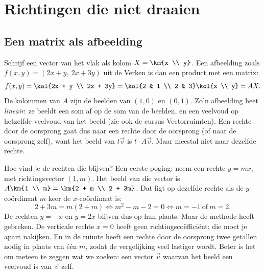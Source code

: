 \begin{oefeningen}[Start]

\end{oefeningen}


\section{Richtingen die niet draaien}

\subsection{Een matrix als afbeelding}

Schrijf een vector van het vlak als kolom $X = \km{x \\ y}$. Een afbeelding zoals $f(x, y) = (2x + y,\ 2x + 3y)$ uit de Verken is dan een product met een matrix:
\[ f(x, y) = \kol{2x + y \\ 2x + 3y} = \kol{2 & 1 \\ 2 & 3}\kol{x \\ y} = AX . \]
De kolommen van $A$ zijn de beelden van $(1, 0)$ en $(0, 1)$. Zo'n afbeelding heet \textit{lineair}: ze beeldt een som af op de som van de beelden, en een veelvoud op hetzelfde veelvoud van het beeld (zie ook de cursus Vectorruimten). Een rechte door de oorsprong gaat dus naar een rechte door de oorsprong (of naar de oorsprong zelf), want het beeld van $t\vec v$ is $t \cdot A\vec v$. Maar meestal niet naar dezelfde rechte.

Hoe vind je de rechten die blijven? Een eerste poging: neem een rechte $y = mx$, met richtingsvector $(1, m)$. Het beeld van die vector is $A\km{1 \\ m} = \km{2 + m \\ 2 + 3m}$. Dat ligt op dezelfde rechte als de $y$-coördinaat $m$ keer de $x$-coördinaat is:
\[ 2 + 3m = m(2 + m) \iff m^2 - m - 2 = 0 \iff m = -1 \ \text{of} \ m = 2 . \]
De rechten $y = -x$ en $y = 2x$ blijven dus op hun plaats. Maar de methode heeft gebreken. De verticale rechte $x = 0$ heeft geen richtingscoëfficiënt: die moet je apart nakijken. En in de ruimte heeft een rechte door de oorsprong twee getallen nodig in plaats van één $m$, zodat de vergelijking veel lastiger wordt. Beter is het om meteen te zeggen wat we zoeken: een vector $\vec v$ waarvan het beeld een veelvoud is van $\vec v$ zelf.

